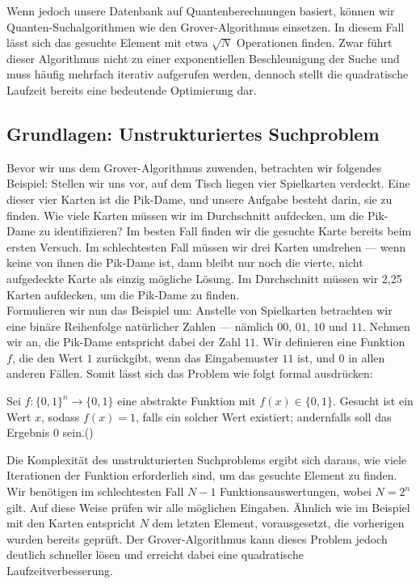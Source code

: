 Wenn jedoch unsere Datenbank auf Quantenberechnungen basiert, können wir Quanten-Suchalgorithmen wie den Grover-Algorithmus einsetzen. In diesem Fall lässt sich das gesuchte Element mit etwa $\sqrt{N}$ Operationen finden. Zwar führt dieser Algorithmus nicht zu einer exponentiellen Beschleunigung der Suche und muss häufig mehrfach iterativ aufgerufen werden, dennoch stellt die quadratische Laufzeit bereits eine bedeutende Optimierung dar.

\subsection{Grundlagen: Unstrukturiertes Suchproblem}
Bevor wir uns dem Grover-Algorithmus zuwenden, betrachten wir folgendes Beispiel: Stellen wir uns vor, auf dem Tisch liegen vier Spielkarten verdeckt. Eine dieser vier Karten ist die Pik-Dame, und unsere Aufgabe besteht darin, sie zu finden. Wie viele Karten müssen wir im Durchschnitt aufdecken, um die Pik-Dame zu identifizieren? Im besten Fall finden wir die gesuchte Karte bereits beim ersten Versuch. Im schlechtesten Fall müssen wir drei Karten umdrehen — wenn keine von ihnen die Pik-Dame ist, dann bleibt nur noch die vierte, nicht aufgedeckte Karte als einzig mögliche Lösung. Im Durchschnitt müssen wir 2{,}25 Karten aufdecken, um die Pik-Dame zu finden.\\

Formulieren wir nun das Beispiel um: Anstelle von Spielkarten betrachten wir eine binäre Reihenfolge natürlicher Zahlen — nämlich $00$, $01$, $10$ und $11$. Nehmen wir an, die Pik-Dame entspricht dabei der Zahl $11$. Wir definieren eine Funktion $f$, die den Wert $1$ zurückgibt, wenn das Eingabemuster $11$ ist, und $0$ in allen anderen Fällen. Somit lässt sich das Problem wie folgt formal ausdrücken:

\begin{definition}
Sei $f\colon \{0, 1\}^n \rightarrow \{0, 1\}$ eine abstrakte Funktion mit $f(x) \in \{0, 1\}$. Gesucht ist ein Wert $x$, sodass $f(x) = 1$, falls ein solcher Wert existiert; andernfalls soll das Ergebnis $0$ sein.(\cite{montanaro_quantum_2016})
\end{definition}

Die Komplexität des unstrukturierten Suchproblems ergibt sich daraus, wie viele Iterationen der Funktion erforderlich sind, um das gesuchte Element zu finden. Wir benötigen im schlechtesten Fall $N - 1$ Funktionsauswertungen, wobei $N = 2^n$ gilt. Auf diese Weise prüfen wir alle möglichen Eingaben. Ähnlich wie im Beispiel mit den Karten entspricht $N$ dem letzten Element, vorausgesetzt, die vorherigen wurden bereits geprüft. Der Grover-Algorithmus kann dieses Problem jedoch deutlich schneller lösen und erreicht dabei eine quadratische Laufzeitverbesserung.\\

